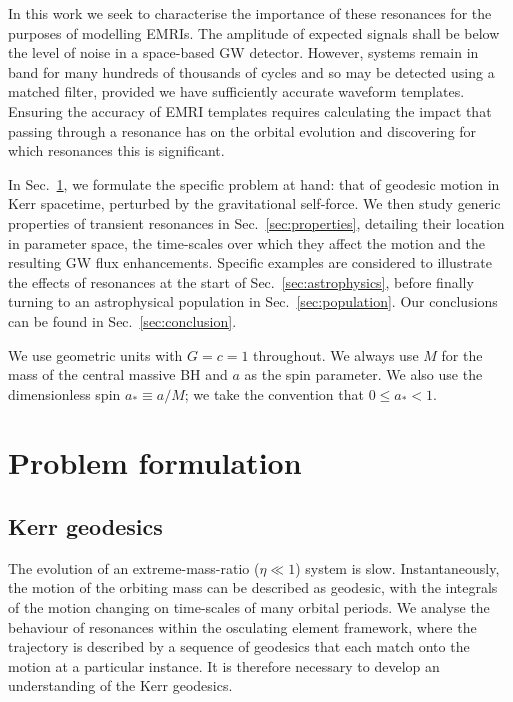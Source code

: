 \documentclass[aps,prd,amsfonts,amssymb,amsmath,nofootinbib,reprint,showpacs,superscriptaddress,twocolumn]{revtex4}
\newcommand{\secref}[1]{Sec.\ \ref{sec:#1}}
\begin{document}
In this work we seek to characterise the importance of these resonances for the purposes of modelling EMRIs. The amplitude of expected signals shall be below the level of noise in a space-based GW detector. However, systems remain in band for many hundreds of thousands of cycles and so may be detected using a matched filter, provided we have sufficiently accurate waveform templates. Ensuring the accuracy of EMRI templates requires calculating the impact that passing through a resonance has on the orbital evolution and discovering for which resonances this is significant.

In \secref{problem}, we formulate the specific problem at hand: that of geodesic motion in Kerr spacetime, perturbed by the gravitational self-force. We then study generic properties of transient resonances in \secref{properties}, detailing their location in parameter space, the time-scales over which they affect the motion and the resulting GW flux enhancements. Specific examples are considered to illustrate the effects of resonances at the start of \secref{astrophysics}, before finally turning to an astrophysical population in \secref{population}. Our conclusions can be found in \secref{conclusion}.

We use geometric units with $G = c = 1$ throughout. We always use $M$ for the mass of the central massive BH and $a$ as the spin parameter. We also use the dimensionless spin $a_\ast \equiv a/M$; we take the convention that $0 \leq a_\ast < 1$.

\section{Problem formulation}
\label{sec:problem}
\subsection{Kerr geodesics}

The evolution of an extreme-mass-ratio ($\eta \ll 1$) system is slow. Instantaneously, the motion of the orbiting mass can be described as geodesic, with the integrals of the motion changing on time-scales of many orbital periods. We analyse the behaviour of resonances within the osculating element framework, where the trajectory is described by a sequence of geodesics that each match onto the motion at a particular instance. It is therefore necessary to develop an understanding of the Kerr geodesics.
\end{document}
